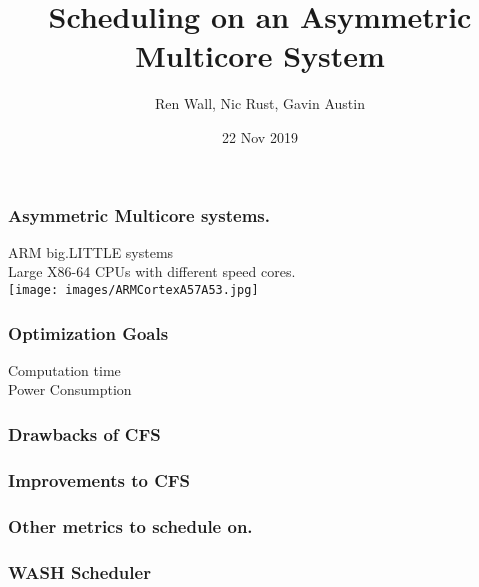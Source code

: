 \documentclass{beamer}
\title{Scheduling on an Asymmetric Multicore System}
\author{Ren Wall, Nic Rust, Gavin Austin}
\institute{}
\date{22 Nov 2019}
\begin{document}
	\frame{\titlepage}
	
	\begin{frame}
		\frametitle{Asymmetric Multicore systems.}
		ARM big.LITTLE systems\\
		Large X86-64 CPUs with different speed cores.\\
		\texttt{[image: images/ARMCortexA57A53.jpg]}
	\end{frame}
	
	\begin{frame}
		\frametitle{Optimization Goals}
		Computation time\\
		Power Consumption\\
	\end{frame}
	
	\begin{frame}
		\frametitle{Drawbacks of CFS}
	\end{frame}
	
	\begin{frame}
		\frametitle{Improvements to CFS}
	\end{frame}
	
	\begin{frame}
		\frametitle{Other metrics to schedule on.}
	\end{frame}
	
	\begin{frame}
		\frametitle{WASH Scheduler}
	\end{frame}
\end{document}
